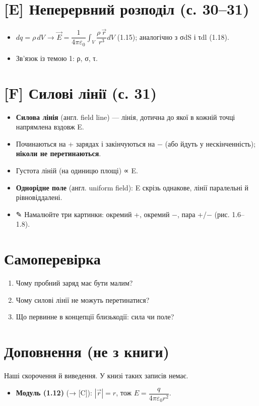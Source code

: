 \documentclass[11pt,a4paper,oneside]{book}
\newcommand{\pen}{{\sffamily\color{accent}✎}}
\begin{document}
\section*{[E] Неперервний розподіл (с. 30–31)}
\begin{itemize}
\item $dq = \rho\,dV$ → $\vec E = \dfrac{1}{4\pi\varepsilon_0}\int_V \dfrac{\rho\,\vec r}{r^3}dV$ (1.15); аналогічно з σdS і τdl (1.18).
\item Зв'язок із темою 1: ρ, σ, τ.
\end{itemize}

\section*{[F] Силові лінії (с. 31)}
\begin{itemize}
\item \textbf{Силова лінія} (англ. field line) — лінія, дотична до якої в кожній точці напрямлена вздовж E.
\item Починаються на + зарядах і закінчуються на − (або йдуть у нескінченність); \textbf{ніколи не перетинаються}.
\item Густота ліній (на одиницю площі) ∝ E.
\item \textbf{Однорідне поле} (англ. uniform field): E скрізь однакове, лінії паралельні й рівновіддалені.
\item \pen{} Намалюйте три картинки: окремий +, окремий −, пара +/− (рис. 1.6–1.8).
\end{itemize}

\section*{Самоперевірка}
\begin{enumerate}
\item Чому пробний заряд має бути малим?
\item Чому силові лінії не можуть перетинатися?
\item Що первинне в концепції близькодії: сила чи поле?
\end{enumerate}

\section*{Доповнення (не з книги)}
Наші скорочення й виведення. У книзі таких записів немає.
\begin{itemize}
\item \textbf{Модуль (1.12)} (→ [C]): $|\vec r| = r$, тож $E = \dfrac{q}{4\pi\varepsilon_0 r^2}$.
\end{itemize}
\end{document}
